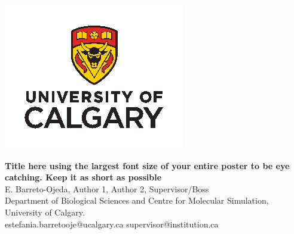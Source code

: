 \documentclass[a0,final,landscape]{a0poster}
\newcommand{\background}[3]{
  \newrgbcolor{cgradbegin}{#1}
  \newrgbcolor{cgradend}{#2}
  \psframe[fillstyle=gradient,gradend=cgradend,
  gradbegin=cgradbegin,gradmidpoint=#3](0.,0.)(1.\textwidth,-1.\textheight)
}
\newenvironment{poster}{
  \begin{center}
  \begin{minipage}[c]{0.98\textwidth}
}{
  \end{minipage} 
  \end{center}
}
\newenvironment{pcolumn}[1]{
  \begin{minipage}{#1\textwidth}
  \begin{center}
}{
  \end{center}
  \end{minipage}
}
\begin{document}
\vspace*{2cm}


\vspace{-3.9cm}
\begin{poster}
\begin{center}
\begin{pcolumn}{0.99}
\begin{minipage}[c][8cm][c]{0.1\textwidth}
  \begin{center}
    \vspace{-0.5cm}
    \hspace{-1cm}
    \includegraphics[scale=1.5]{img/UofC-vert.png}
  \end{center}
\end{minipage}
\begin{minipage}[c][10cm][c]{0.78\textwidth}
  \begin{center}
    {\veryHuge \textcolor{blue1}{\textbf{Title here using the largest font size of your entire poster to be eye catching. Keep it as short as possible}}}\\
    \Huge E. Barreto-Ojeda, Author 1, Author 2, Supervisor/Boss \\
    \LARGE Department of Biological Sciences and Centre for Molecular Simulation, University of Calgary.\\
    \LARGE estefania.barretooje@ucalgary.ca\hspace{2cm} supervisor@institution.ca
  \end{center}
\end{minipage}
\begin{minipage}[c][8cm][c]{0.08\textwidth}
  \begin{center}

\end{center}
\end{minipage}
\end{pcolumn}
\end{center}
\end{poster}
\end{document}
